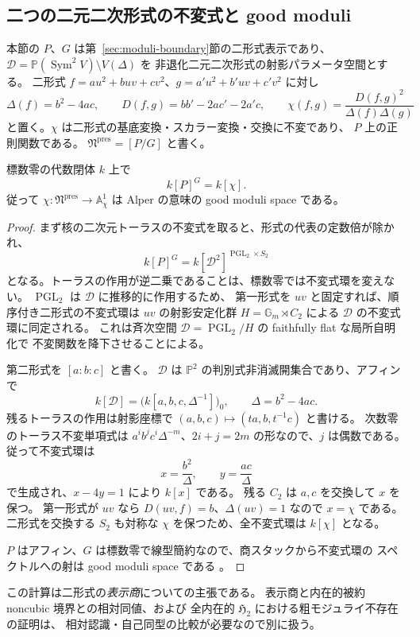 \subsection{二つの二元二次形式の不変式と good moduli}
\label{subsec:moduli-noncubic-invariants}

本節の $P$、$G$ は第~\ref{sec:moduli-boundary}節の二形式表示であり、
$\mathcal D=\mathbb P(\operatorname{Sym}^2V)\setminus V(\Delta)$ を
非退化二元二次形式の射影パラメータ空間とする。
二形式 $f=a u^2+buv+c v^2$、$g=a'u^2+b'uv+c'v^2$ に対し
\[
 \Delta(f)=b^2-4ac,\qquad D(f,g)=bb'-2ac'-2a'c,\qquad
 \chi(f,g)=\frac{D(f,g)^2}{\Delta(f)\Delta(g)}
\]
と置く。$\chi$ は二形式の基底変換・スカラー変換・交換に不変であり、
$P$ 上の正則関数である。
$\mathfrak N^{\mathrm{pres}}=[P/G]$ と書く。

\begin{proposition}[表示スタックの良モジュライ]
\label{prop:moduli-noncubic-good-moduli}
標数零の代数閉体 $k$ 上で
\[
 k[P]^G=k[\chi].
\]
従って $\chi:\mathfrak N^{\mathrm{pres}}\to\mathbb A^1_\chi$ は
Alper の意味の good moduli space である。
\end{proposition}
\begin{proof}
まず核の二次元トーラスの不変式を取ると、形式の代表の定数倍が除かれ、
\[
 k[P]^G
 =k[\mathcal D^2]^{\operatorname{PGL}_2\times S_2}
\]
となる。トーラスの作用が逆二乗であることは、標数零では不変式環を変えない。
$\operatorname{PGL}_2$ は $\mathcal D$ に推移的に作用するため、
第一形式を $uv$ と固定すれば、順序付き二形式の不変式環は
$uv$ の射影安定化群 $H=\mathbb G_m\rtimes C_2$ による
$\mathcal D$ の不変式環に同定される。
これは斉次空間 $\mathcal D=\operatorname{PGL}_2/H$ の faithfully flat な局所自明化で
不変関数を降下させることによる。

第二形式を $[a:b:c]$ と書く。
$\mathcal D$ は $\mathbb P^2$ の判別式非消滅開集合であり、アフィンで
\[
 k[\mathcal D]=\bigl(k[a,b,c,\Delta^{-1}]\bigr)_0,
 \qquad \Delta=b^2-4ac.
\]
残るトーラスの作用は射影座標で
$(a,b,c)\mapsto(t a,b,t^{-1}c)$ と書ける。
次数零のトーラス不変単項式は
$a^i b^j c^i\Delta^{-m}$、$2i+j=2m$ の形なので、$j$ は偶数である。
従って不変式環は
\[
 x=\frac{b^2}{\Delta},\qquad y=\frac{ac}{\Delta}
\]
で生成され、$x-4y=1$ により $k[x]$ である。
残る $C_2$ は $a,c$ を交換して $x$ を保つ。
第一形式が $uv$ なら $D(uv,f)=b$、$\Delta(uv)=1$ なので $x=\chi$ である。
二形式を交換する $S_2$ も対称な $\chi$ を保つため、全不変式環は $k[\chi]$ となる。

$P$ はアフィン、$G$ は標数零で線型簡約なので、商スタックから不変式環の
スペクトルへの射は good moduli space である
\cite[Example 8.3, Theorem 13.2]{Alper2009}。
\end{proof}

この計算は二形式の\emph{表示商}についての主張である。
表示商と内在的被約 noncubic 境界との相対同値、および
全内在的 $\mathfrak H_2$ における粗モジュライ不存在の証明は、
相対認識・自己同型の比較が必要なので別に扱う。
